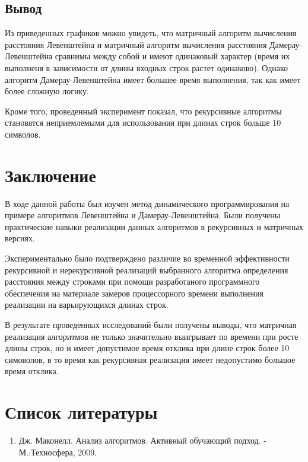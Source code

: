 \documentclass[14pt]{report}
\begin{document}
\section*{Вывод}
Из приведенных графиков можно увидеть, что матричный алгоритм вычисления расстояния Левенштейна и матричный алгоритм вычисления расстояния Дамерау-Левенштейна сравнимы между собой и имеют одинаковый характер (время их выполненя в зависимости от длины входных строк растет одинаково). Однако алгоритм Дамерау-Левенштейна имеет большее время выполнения, так как имеет более сложную логику.

Кроме того, проведенный эксперимент показал, что рекурсивные алгоритмы становятся неприемлемыми для использования при длинах строк больше 10 символов.

\chapter*{Заключение}

В ходе данной работы был изучен метод динамического программирования на примере алгоритмов Левенштейна и Дамерау-Левенштейна. Были получены практические навыки реализации данных алгоритмов в рекурсивных и матричных версиях.
\par
Экспериментально было подтверждено различие во временной эффективности рекурсивной и нерекурсивной реализаций выбранного алгоритма определения расстояния между строками при помощи разработаного программного обеспечения на материале замеров процессорного времени выполнения реализации на варьирующихся длинах строк.
\par
В результате проведенных исследований были получены выводы, что матричная реализация алгоритмов не только значительно выигрывает по времени при росте длины строк, но и имеет допустимое время отклика при длине строк более 10 симоволов, в то время как рекурсивная реализация имеет недопустимо большое время отклика.

\chapter*{Список литературы}

\begin{enumerate}
	\item Дж. Маконелл. Анализ алгоритмов. Активный обучающий подход. - М.:Техносфера, 2009.
\end{enumerate}
\end{document}
